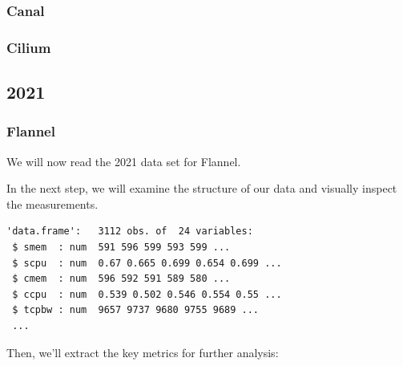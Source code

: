 \subsubsection{Canal}

\subsubsection{Cilium}

\subsection{2021}

\subsubsection{Flannel}

We will now read the 2021 data set for Flannel.

\begin{Shaded}
\begin{Highlighting}[]
\OtherTok{\textless{}{-}} 
\OtherTok{\textless{}{-}} \NormalTok{(}\NormalTok{,}\NormalTok{))}
\end{Highlighting}
\end{Shaded}

In the next step, we will examine the structure of our data and visually
inspect the measurements.

\begin{Shaded}
\begin{Highlighting}[]
\end{Highlighting}
\end{Shaded}

\begin{verbatim}
'data.frame':   3112 obs. of  24 variables:
 $ smem  : num  591 596 599 593 599 ...
 $ scpu  : num  0.67 0.665 0.699 0.654 0.699 ...
 $ cmem  : num  596 592 591 589 580 ...
 $ ccpu  : num  0.539 0.502 0.546 0.554 0.55 ...
 $ tcpbw : num  9657 9737 9680 9755 9689 ...
 ...
\end{verbatim}

Then, we'll extract the key metrics for further analysis:

\begin{Shaded}
\begin{Highlighting}[]
\SpecialCharTok{\$}
\end{Highlighting}
\end{Shaded}


